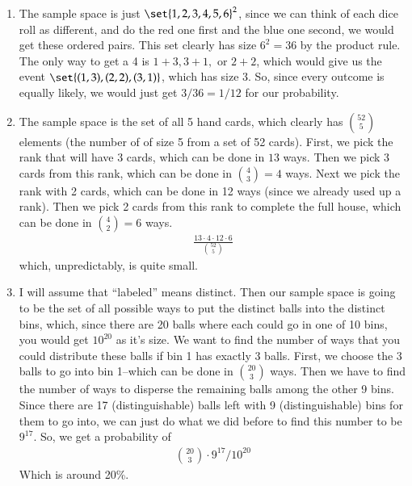 \documentclass[12pt]{article}
\theoremstyle{definition}
\theoremstyle{remark}
\begin{document}
\begin{enumerate}[leftmargin=\labelsep]
\begin{enumerate}
			\item The sample space is just $\set{1, 2, 3, 4, 5, 6}^2$, since we can think of each dice roll as different, and do the red one first and the blue one second, we would get these ordered pairs. This set clearly has size $6^2 = 36$ by the product rule. The only way to get a 4 is $1 + 3, 3 + 1, $ or $2 + 2$, which would give us the event $\set{(1, 3), (2, 2), (3, 1)}$, which has size 3. So, since every outcome is equally likely, we would just get $3/36 = 1/12$ for our probability.
			
			\item The sample space is the set of all 5 hand cards, which clearly has ${52 \choose 5}$ elements (the number of of size 5 from a set of 52 cards). First, we pick the rank that will have 3 cards, which can be done in $13$ ways. Then we pick 3 cards from this rank, which can be done in ${4 \choose 3} = 4$ ways. Next we pick the rank with 2 cards, which can be done in 12 ways (since we already used up a rank). Then we pick 2 cards from this rank to complete the full house, which can be done in ${4 \choose 2} = 6$ ways.
			\begin{align*}
				\frac{13 \cdot 4 \cdot 12 \cdot 6}{{52 \choose 5}}
			\end{align*}
			which, unpredictably, is quite small.
			
			\item I will assume that ``labeled'' means distinct. Then our sample space is going to be the set of all possible ways to put the distinct balls into the distinct bins, which, since there are 20 balls where each could go in one of 10 bins, you would get $10^{20}$ as it's size. We want to find the number of ways that you could distribute these balls if bin 1 has exactly 3 balls. First, we choose the 3 balls to go into bin 1--which can be done in ${20 \choose 3}$ ways. Then we have to find the number of ways to disperse the remaining balls among the other 9 bins. Since there are 17 (distinguishable) balls left with 9 (distinguishable) bins for them to go into, we can just do what we did before to find this number to be $9^{17}$. So, we get a probability of 
			\begin{align*}
				{20 \choose 3} \cdot 9^{17} / 10^{20}
			\end{align*}
			Which is around 20\%. 
			

\end{enumerate}
\end{enumerate}
\end{document}
